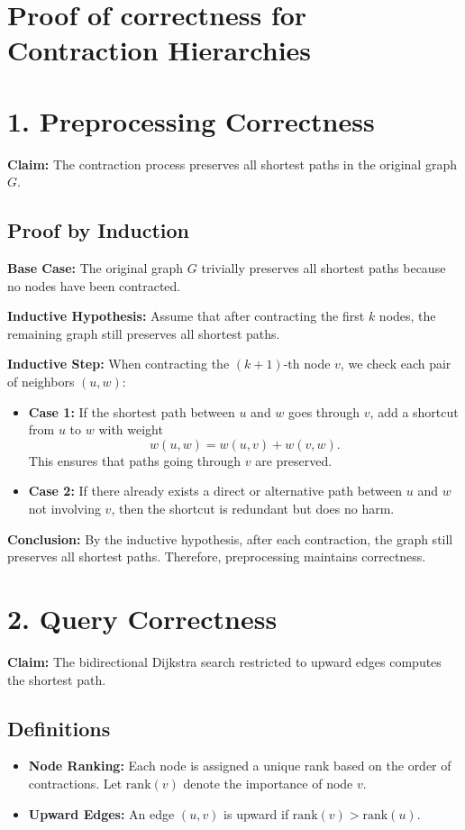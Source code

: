 \begin{appendices}
\section{Proof of correctness for Contraction Hierarchies}\label{appendix:contraction:correctness}
	\section*{1. Preprocessing Correctness}
	\textbf{Claim:} The contraction process preserves all shortest paths in the original graph \(G\).
	
	\subsection*{Proof by Induction}
	\textbf{Base Case:}  
	The original graph \(G\) trivially preserves all shortest paths because no nodes have been contracted.
	
	\textbf{Inductive Hypothesis:}  
	Assume that after contracting the first \(k\) nodes, the remaining graph still preserves all shortest paths.
	
	\textbf{Inductive Step:}  
	When contracting the \((k+1)\)-th node \(v\), we check each pair of neighbors \((u, w)\):
	
	\begin{itemize}
		\item \textbf{Case 1:} If the shortest path between \(u\) and \(w\) goes through \(v\), add a shortcut from \(u\) to \(w\) with weight  
		\[
		w(u, w) = w(u, v) + w(v, w).
		\]
		This ensures that paths going through \(v\) are preserved.
		\item \textbf{Case 2:} If there already exists a direct or alternative path between \(u\) and \(w\) not involving \(v\), then the shortcut is redundant but does no harm.
	\end{itemize}
	
	\textbf{Conclusion:} By the inductive hypothesis, after each contraction, the graph still preserves all shortest paths. Therefore, preprocessing maintains correctness.
	
	\section*{2. Query Correctness}
	\textbf{Claim:} The bidirectional Dijkstra search restricted to upward edges computes the shortest path.
	
	\subsection*{Definitions}
	\begin{itemize}
		\item \textbf{Node Ranking:} Each node is assigned a unique rank based on the order of contractions. Let \(\mathrm{rank}(v)\) denote the importance of node \(v\).
		\item \textbf{Upward Edges:} An edge \((u, v)\) is upward if \(\mathrm{rank}(v) > \mathrm{rank}(u)\).
	\end{itemize}
	

\end{appendices}
